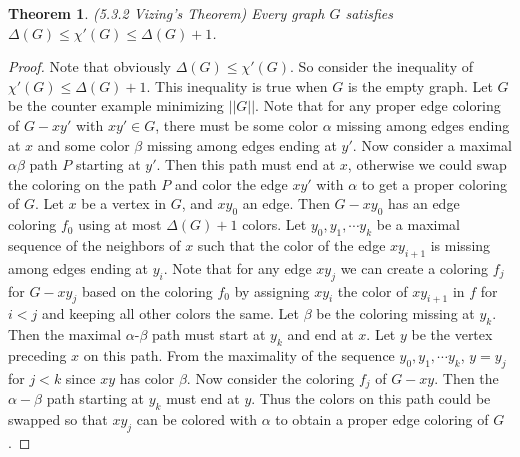 \documentclass[12pt]{article}
\newtheorem{theorem}{Theorem}
\begin{document}
\begin{theorem} (5.3.2 Vizing's Theorem) Every graph $G$ satisfies
  $\Delta(G) \leq \chi'(G) \leq \Delta(G) + 1$.
\end{theorem}
\begin{proof} Note that obviously $\Delta(G) \leq \chi'(G)$. So
  consider the inequality of $\chi'(G) \leq \Delta(G) + 1$. This
  inequality is true when $G$ is the empty graph. Let $G$ be the
  counter example minimizing $||G||$. Note that for any proper edge
  coloring of $G-xy'$ with $xy' \in G$, there must be some color
  $\alpha$ missing among edges ending at $x$ and some color $\beta$
  missing among edges ending at $y'$. Now consider a maximal
  $\alpha \beta$ path $P$ starting at $y'$. Then this path must end at
  $x$, otherwise we could swap the coloring on the path $P$ and color
  the edge $xy'$ with $\alpha$ to get a proper coloring of $G$.  Let
  $x$ be a vertex in $G$, and $xy_0$ an edge. Then $G-xy_0$ has an
  edge coloring $f_0$ using at most $\Delta(G) + 1$ colors. Let
  $y_0, y_1, \cdots y_k$ be a maximal sequence of the neighbors of $x$
  such that the color of the edge $x y_{i + 1}$ is missing among edges
  ending at $y_i$. Note that for any edge $x y_j$ we can create a
  coloring $f_j$ for $G-x y_j$ based on the coloring $f_0$ by
  assigning $x y_i$ the color of $x y_{i + 1}$ in $f$ for $i < j$ and
  keeping all other colors the same. Let $\beta$ be the coloring
  missing at $y_k$. Then the maximal $\alpha$-$\beta$ path must start
  at $y_k$ and end at $x$. Let $y$ be the vertex preceding $x$ on this
  path. From the maximality of the sequence $y_0, y_1, \cdots y_k$,
  $y = y_j$ for $j < k$ since $x y$ has color $\beta$. Now consider
  the coloring $f_j$ of $G - xy$. Then the $\alpha-\beta$ path
  starting at $y_k$ must end at $y$. Thus the colors on this path
  could be swapped so that $xy_j$ can be colored with $\alpha$ to
  obtain a proper edge coloring of $G$.
\end{proof}
\end{document}
